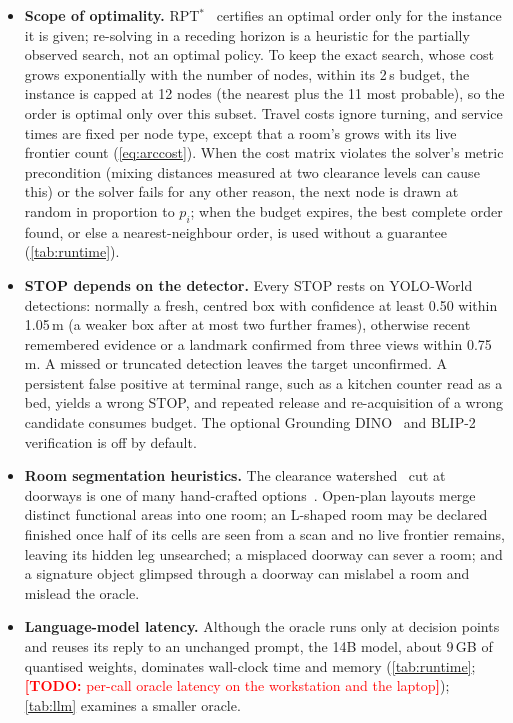 \documentclass[10pt]{article}
\newcommand{\TODO}[1]{\textcolor{red}{\textbf{[TODO:} #1\textbf{]}}}
\begin{document}
\begin{itemize}[leftmargin=*,itemsep=2pt]
\item \textbf{Scope of optimality.} RPT$^*$~\citep{lyu2026rpt} certifies an optimal order only for the instance it is
given; re-solving in a receding horizon is a heuristic for the partially observed search, not an optimal policy. To keep
the exact search, whose cost grows exponentially with the number of nodes, within its 2\,s budget, the instance is
capped at 12 nodes (the nearest plus the 11 most probable), so the order is optimal only over this subset. Travel costs
ignore turning, and service times are fixed per node type, except that a room's grows with its live frontier count
(\cref{eq:arccost}). When the cost matrix violates the
solver's metric precondition (mixing distances measured at two clearance levels can cause this) or the solver fails for
any other reason, the next node is drawn at random in proportion to $p_i$; when the budget expires, the best complete
order found, or else a nearest-neighbour order, is used without a guarantee (\cref{tab:runtime}).

\item \textbf{STOP depends on the detector.} Every STOP rests on YOLO-World~\citep{cheng2024yolo} detections: normally
a fresh, centred box with confidence at least 0.50 within 1.05\,m (a weaker box after at most two further frames),
otherwise recent remembered evidence or a landmark
confirmed from three views within 0.75\,m. A missed or truncated detection leaves the target unconfirmed. A persistent false positive at terminal range, such as a kitchen
counter read as a bed, yields a wrong STOP, and repeated release and re-acquisition of a wrong candidate consumes
budget. The optional Grounding DINO~\citep{liu2024grounding} and BLIP-2~\citep{li2023blip} verification is off by
default.

\item \textbf{Room segmentation heuristics.} The clearance watershed~\citep{vincent1991watersheds} cut at doorways is
one of many hand-crafted options~\citep{bormann2016room}. Open-plan layouts merge distinct functional areas into one
room; an L-shaped room may be declared finished once half of its cells are seen from a scan and no live frontier
remains, leaving its hidden leg
unsearched; a misplaced doorway can sever a room; and a signature object glimpsed through a doorway can mislabel a
room and mislead the oracle.

\item \textbf{Language-model latency.} Although the oracle runs only at decision points and reuses its reply to an
unchanged prompt, the 14B model, about 9\,GB of quantised weights, dominates wall-clock time and memory (\cref{tab:runtime}; \TODO{per-call oracle latency on the workstation and the
laptop}); \cref{tab:llm} examines a smaller oracle.


\end{itemize}
\end{document}

